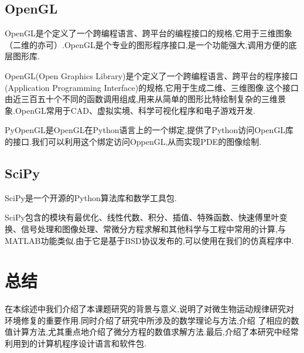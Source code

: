 \documentclass[a4paper,cs4size,adobefonts,fancyhdr]{ctexart}[2005/11/25]
\newcommand{\upcite}[1]{\textsuperscript{\textsuperscript{\cite{#1}}}}
\begin{document}
\subsection{OpenGL}
OpenGL\upcite{王玉珉2004}是个定义了一个跨编程语言、跨平台的编程接口的规格,它用于三维图象（二维的亦可）.OpenGL是个专业的图形程序接口,是一个功能强大,调用方便的底层图形库.\par
OpenGL(Open Graphics Library)是个定义了一个跨编程语言、跨平台的程序接口(Application Programming Interface)的规格,它用于生成二维、三维图像.这个接口由近三百五十个不同的函数调用组成,用来从简单的图形比特绘制复杂的三维景象.OpenGL常用于CAD、虚拟实境、科学可视化程序和电子游戏开发.\par
PyOpenGL是OpenGL在Python语言上的一个绑定,提供了Python访问OpenGL库的接口.我们可以利用这个绑定访问OppenGL,从而实现PDE的图像绘制.
\subsection{SciPy}
SciPy\upcite{袁光伟2013}是一个开源的Python算法库和数学工具包.\par
SciPy包含的模块有最优化、线性代数、积分、插值、特殊函数、快速傅里叶变换、信号处理和图像处理、常微分方程求解和其他科学与工程中常用的计算,与MATLAB功能类似.由于它是基于BSD协议发布的,可以使用在我们的仿真程序中.
\section{总结}
在本综述中我们介绍了本课题研究的背景与意义,说明了对微生物运动规律研究对环境修复的重要作用.同时介绍了研究中所涉及的数学理论与方法,介绍
了相应的数值计算方法,尤其重点地介绍了微分方程的数值求解方法.最后,介绍了本研究中经常利用到的计算机程序设计语言和软件包.
\clearpage


\end{document}
